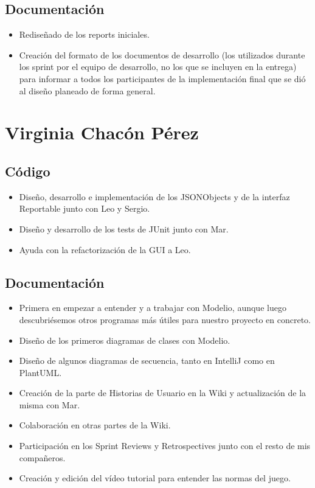 \documentclass[../FINAL/Scrum/SCRUM.tex]{subfiles}
\begin{document}
\subsection*{Documentación}
\begin{itemize}
\item Rediseñado de los reports iniciales.
\item Creación del formato de los documentos de desarrollo (los utilizados durante los sprint por el equipo de desarrollo, no los que se incluyen en la entrega) para informar a todos los participantes de la implementación final que se dió al diseño planeado de forma general.
\end{itemize}

\section{Virginia Chacón Pérez}
\subsection*{Código}
\begin{itemize}
\item Diseño, desarrollo e implementación de los JSONObjects y de la interfaz Reportable junto con Leo y Sergio.
\item Diseño y desarrollo de los tests de JUnit junto con Mar.
\item Ayuda con la refactorización de la GUI a Leo.
\end{itemize}
\subsection*{Documentación}
\begin{itemize}
\item Primera en empezar a entender y a trabajar con Modelio, aunque luego descubriésemos otros programas más útiles para nuestro proyecto en concreto.
\item Diseño de los primeros diagramas de clases con Modelio.
\item Diseño de algunos diagramas de secuencia, tanto en IntelliJ como en PlantUML.
\item Creación de la parte de Historias de Usuario en la Wiki y actualización de la misma con Mar.
\item Colaboración en otras partes de la Wiki.
\item Participación en los Sprint Reviews y Retrospectives junto con el resto de mis compañeros.
\item Creación y edición del vídeo tutorial para entender las normas del juego.
\end{itemize}
\end{document}
